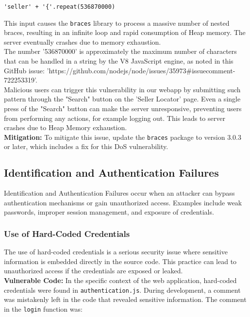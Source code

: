 \documentclass[]{article}
\begin{document}
\begin{lstlisting}
'seller' + '{'.repeat(536870000)
\end{lstlisting}
This input causes the \texttt{braces} library to process a massive number of nested braces, resulting in an infinite loop and rapid consumption of Heap memory. The server eventually crashes due to memory exhaustion. \\ 
The number '536870000' is approximately the maximum number of characters that can be handled in a string by the V8 JavaScript engine, as noted in this GitHub issue: \footnotesize 'https://github.com/nodejs/node/issues/35973\#issuecomment-722253319'.\\
\normalsize
Malicious users can trigger this vulnerability in our webapp by submitting such pattern through the "Search" button on the 'Seller Locator' page. Even a single press of the "Search" button can make the server unresponsive, preventing users from performing any actions, for example logging out. This leads to server crashes due to Heap Memory exhaustion. \\ 

\textbf{Mitigation:}
To mitigate this issue, update the \texttt{braces} package to version 3.0.3 or later, which includes a fix for this DoS vulnerability.

\subsection{Identification and Authentication Failures}

Identification and Authentication Failures occur when an attacker can bypass authentication mechanisms or gain unauthorized access. Examples include weak passwords, improper session management, and exposure of credentials.

\subsubsection{Use of Hard-Coded Credentials}

The use of hard-coded credentials is a serious security issue where sensitive information is embedded directly in the source code. This practice can lead to unauthorized access if the credentials are exposed or leaked. \\
\textbf{Vulnerable Code:}
In the specific context of the web application, hard-coded credentials were found in \texttt{authentication.js}. During development, a comment was mistakenly left in the code that revealed sensitive information. The comment in the \texttt{login} function was:
\end{document}
